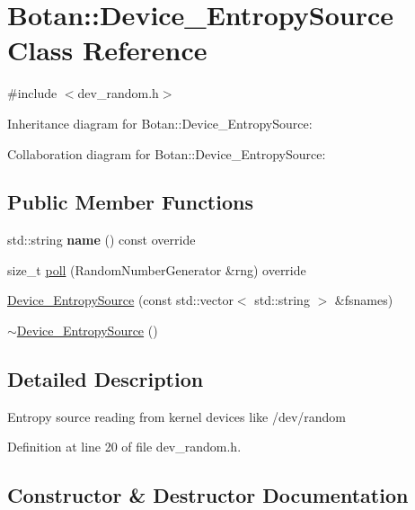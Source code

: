 \hypertarget{class_botan_1_1_device___entropy_source}{}\section{Botan\+:\+:Device\+\_\+\+Entropy\+Source Class Reference}
\label{class_botan_1_1_device___entropy_source}


{\ttfamily \#include $<$dev\+\_\+random.\+h$>$}



Inheritance diagram for Botan\+:\+:Device\+\_\+\+Entropy\+Source\+:


Collaboration diagram for Botan\+:\+:Device\+\_\+\+Entropy\+Source\+:
\subsection*{Public Member Functions}
\begin{DoxyCompactItemize}
\item 
\mbox{\label{class_botan_1_1_device___entropy_source_ae1be33b13c24eaa92d990bb1ace84da8}} 
std\+::string {\bfseries name} () const override
\item 
size\+\_\+t \mbox{\hyperlink{class_botan_1_1_device___entropy_source_aaff331d75f17088ff6ccbd24c07a436c}{poll}} (Random\+Number\+Generator \&rng) override
\item 
\mbox{\hyperlink{class_botan_1_1_device___entropy_source_ae841d972477af247e5332b68855f4457}{Device\+\_\+\+Entropy\+Source}} (const std\+::vector$<$ std\+::string $>$ \&fsnames)
\item 
\mbox{\hyperlink{class_botan_1_1_device___entropy_source_aa5b299286c2498607c59842b2dfa054b}{$\sim$\+Device\+\_\+\+Entropy\+Source}} ()
\end{DoxyCompactItemize}


\subsection{Detailed Description}
Entropy source reading from kernel devices like /dev/random 

Definition at line 20 of file dev\+\_\+random.\+h.



\subsection{Constructor \& Destructor Documentation}
\mbox{\label{class_botan_1_1_device___entropy_source_ae841d972477af247e5332b68855f4457}} 
